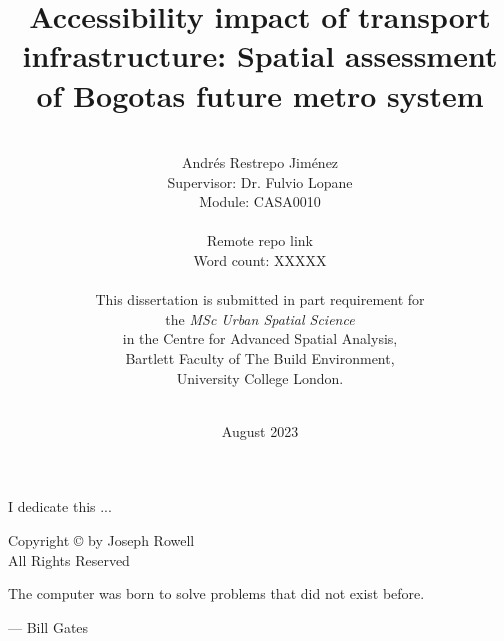 \documentclass[12pt, a4paper]{report}
\date{August 2023}
\title{Accessibility impact of transport infrastructure: Spatial assessment of Bogota\textquotesingle s future metro system}
\author{\\ \Large{Andr\'{e}s Restrepo Jim\'{e}nez}
\\ Supervisor: Dr. Fulvio Lopane 
\\ Module: CASA0010
\\
\\ Remote repo link
\\ Word count: XXXXX
\\
\\
This dissertation is submitted in part requirement for \\the \textit{MSc Urban Spatial Science} \\in the Centre for Advanced Spatial Analysis, \\Bartlett Faculty of The Build Environment, \\University College London.
\\ \\
}
\begin{document}
      

\thispagestyle{headings}
\maketitle
\FloatBarrier
{}

\thispagestyle{empty}
\begin{abstract}


\end{abstract}
\newpage
\thispagestyle{empty}
\begin{center}
I dedicate this ...
\end{center}

\newpage
\thispagestyle{empty}
\vspace*{\fill}
\begin{center}
Copyright \copyright  {} by Joseph Rowell \\ All Rights Reserved
\end{center}
\vspace*{\fill}
\newpage
\thispagestyle{empty}
\epigraph{The computer was born to solve problems that did not exist before.}{--- \textup{Bill Gates}}
\end{document}

